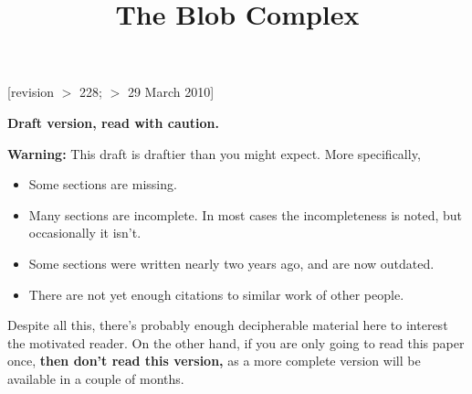 \documentclass[11pt,leqno]{amsart}
\title{The Blob Complex}
\begin{document}
\makeatletter
{}
\gdef\theequation{\thesection.\arabic{equation}}
\makeatother

\maketitle


[revision $>$ 228;  $>$ 29 March 2010]

\textbf{Draft version, read with caution.}

\medskip


\noindent
{\bf Warning:} This draft is draftier than you might expect.
More specifically,
\begin{itemize}
\item Some sections are missing.
\item Many sections are incomplete.
In most cases the incompleteness is noted, but occasionally it isn't.
\item Some sections were written nearly two years ago, and are now outdated.
\item There are not yet enough citations to similar work of other people.
\end{itemize}
Despite all this, there's probably enough decipherable material
here to interest the motivated reader.
On the other hand, if you are only going to read this paper once,
{\bf then don't read this version,} as a more complete version will be available in a couple of months.






%


















\appendix


\end{document}
